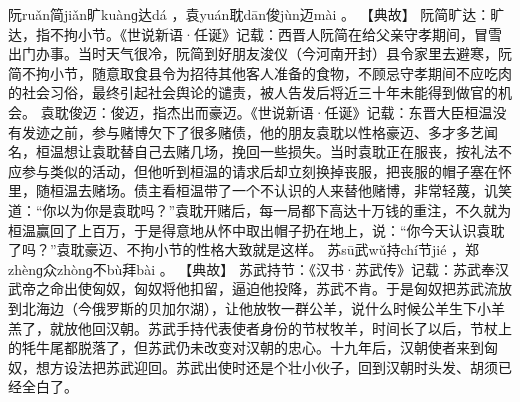 \documentclass[12pt,UTF8]{ctexbook}
\begin{document}
阮ruǎn简jiǎn旷kuànɡ达dá
，袁yuán耽dān俊jùn迈mài
。
【典故】
阮简旷达：旷达，指不拘小节。《世说新语·任诞》记载：西晋人阮简在给父亲守孝期间，冒雪出门办事。当时天气很冷，阮简到好朋友浚仪（今河南开封）县令家里去避寒，阮简不拘小节，随意取食县令为招待其他客人准备的食物，不顾忌守孝期间不应吃肉的社会习俗，最终引起社会舆论的谴责，被人告发后将近三十年未能得到做官的机会。
袁耽俊迈：俊迈，指杰出而豪迈。《世说新语·任诞》记载：东晋大臣桓温没有发迹之前，参与赌博欠下了很多赌债，他的朋友袁耽以性格豪迈、多才多艺闻名，桓温想让袁耽替自己去赌几场，挽回一些损失。当时袁耽正在服丧，按礼法不应参与类似的活动，但他听到桓温的请求后却立刻换掉丧服，把丧服的帽子塞在怀里，随桓温去赌场。债主看桓温带了一个不认识的人来替他赌博，非常轻蔑，讥笑道：“你以为你是袁耽吗？”袁耽开赌后，每一局都下高达十万钱的重注，不久就为桓温赢回了上百万，于是得意地从怀中取出帽子扔在地上，说：“你今天认识袁耽了吗？”袁耽豪迈、不拘小节的性格大致就是这样。
苏sū武wǔ持chí节jié
，郑zhènɡ众zhònɡ不bù拜bài
。
【典故】
苏武持节：《汉书·苏武传》记载：苏武奉汉武帝之命出使匈奴，匈奴将他扣留，逼迫他投降，苏武不肯。于是匈奴把苏武流放到北海边（今俄罗斯的贝加尔湖），让他放牧一群公羊，说什么时候公羊生下小羊羔了，就放他回汉朝。苏武手持代表使者身份的节杖牧羊，时间长了以后，节杖上的牦牛尾都脱落了，但苏武仍未改变对汉朝的忠心。十九年后，汉朝使者来到匈奴，想方设法把苏武迎回。苏武出使时还是个壮小伙子，回到汉朝时头发、胡须已经全白了。
\end{document}
